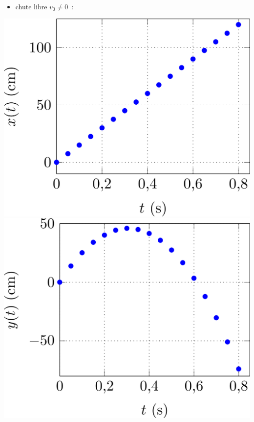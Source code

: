 \documentclass[../../main/main.tex]{subfiles}
\begin{document}
\begin{minipage}{0.31\linewidth}
	\begin{itemize}
		\item chute libre $v_0 \neq 0$~:
	\end{itemize}
	\begin{center}
		\includegraphics[width=\linewidth]{x_vo}
		\includegraphics[width=\linewidth]{y_vo}
	\end{center}
\end{minipage}
\end{document}
